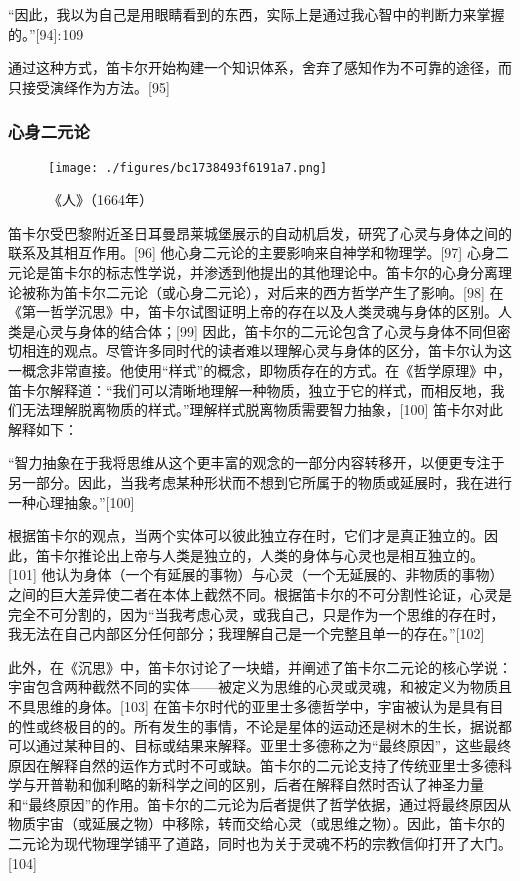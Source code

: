 “因此，我以为自己是用眼睛看到的东西，实际上是通过我心智中的判断力来掌握的。”[94]: 109

通过这种方式，笛卡尔开始构建一个知识体系，舍弃了感知作为不可靠的途径，而只接受演绎作为方法。[95]
\subsubsection{心身二元论}
\begin{figure}[ht]
\centering
\texttt{[image: ./figures/bc1738493f6191a7.png]}
\caption{《人》（1664年）} \label{fig_DKE_10}
\end{figure}
笛卡尔受巴黎附近圣日耳曼昂莱城堡展示的自动机启发，研究了心灵与身体之间的联系及其相互作用。[96] 他心身二元论的主要影响来自神学和物理学。[97] 心身二元论是笛卡尔的标志性学说，并渗透到他提出的其他理论中。笛卡尔的心身分离理论被称为笛卡尔二元论（或心身二元论），对后来的西方哲学产生了影响。[98] 在《第一哲学沉思》中，笛卡尔试图证明上帝的存在以及人类灵魂与身体的区别。人类是心灵与身体的结合体；[99] 因此，笛卡尔的二元论包含了心灵与身体不同但密切相连的观点。尽管许多同时代的读者难以理解心灵与身体的区分，笛卡尔认为这一概念非常直接。他使用“样式”的概念，即物质存在的方式。在《哲学原理》中，笛卡尔解释道：“我们可以清晰地理解一种物质，独立于它的样式，而相反地，我们无法理解脱离物质的样式。”理解样式脱离物质需要智力抽象，[100] 笛卡尔对此解释如下：

“智力抽象在于我将思维从这个更丰富的观念的一部分内容转移开，以便更专注于另一部分。因此，当我考虑某种形状而不想到它所属于的物质或延展时，我在进行一种心理抽象。”[100]

根据笛卡尔的观点，当两个实体可以彼此独立存在时，它们才是真正独立的。因此，笛卡尔推论出上帝与人类是独立的，人类的身体与心灵也是相互独立的。[101] 他认为身体（一个有延展的事物）与心灵（一个无延展的、非物质的事物）之间的巨大差异使二者在本体上截然不同。根据笛卡尔的不可分割性论证，心灵是完全不可分割的，因为“当我考虑心灵，或我自己，只是作为一个思维的存在时，我无法在自己内部区分任何部分；我理解自己是一个完整且单一的存在。”[102]

此外，在《沉思》中，笛卡尔讨论了一块蜡，并阐述了笛卡尔二元论的核心学说：宇宙包含两种截然不同的实体——被定义为思维的心灵或灵魂，和被定义为物质且不具思维的身体。[103] 在笛卡尔时代的亚里士多德哲学中，宇宙被认为是具有目的性或终极目的的。所有发生的事情，不论是星体的运动还是树木的生长，据说都可以通过某种目的、目标或结果来解释。亚里士多德称之为“最终原因”，这些最终原因在解释自然的运作方式时不可或缺。笛卡尔的二元论支持了传统亚里士多德科学与开普勒和伽利略的新科学之间的区别，后者在解释自然时否认了神圣力量和“最终原因”的作用。笛卡尔的二元论为后者提供了哲学依据，通过将最终原因从物质宇宙（或延展之物）中移除，转而交给心灵（或思维之物）。因此，笛卡尔的二元论为现代物理学铺平了道路，同时也为关于灵魂不朽的宗教信仰打开了大门。[104]

